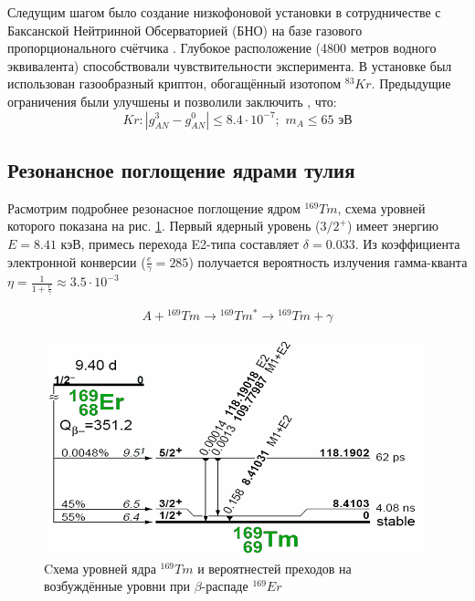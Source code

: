 \documentclass[a4paper,article,14pt]{extarticle}
\begin{document}
Следущим шагом было создание низкофоновой установки в сотрудничестве с Баксанской Нейтринной Обсерваторией (БНО) на базе газового пропорционального счётчика \cite{83Kr}. Глубокое расположение (4800 метров водного эквивалента) способствовали чувствительности эксперимента. В установке был использован газообразный криптон, обогащённый изотопом $^{83}Kr$. Предыдущие ограничения были улучшены \cite{Derbin_2017_Kr} и позволили заключить , что:
\begin{equation}
    Kr:\left| {g_{AN}^3 - g_{AN}^0} \right| \leqslant 8.4 \cdot {10^{ - 7}};\,\,{m_A} \leqslant 65 \text{ эВ}
\end{equation}

\subsection{Резонансное поглощение ядрами тулия}

Расмотрим подробнее резонасное поглощение ядром $^{169}Tm$, схема уровней  которого показана на рис. \ref{tmlvls}. Первый ядерный уровень ($3/2^+$) имеет энергию $E = 8.41 \text{ кэВ}$, примесь перехода E2-типа составляет $\delta = 0.033$. Из коэффициента электронной конверсии ($\frac{e}{\gamma} = 285$) \cite{lederer1978table} получается вероятность излучения гамма-кванта $\eta = \frac{1}{1 + \frac{e}{\gamma}} \approx 3.5 \cdot 10^{-3}$

\begin{equation}
    A + {}^{169}Tm \rightarrow {}^{169}Tm^{*} \rightarrow {}^{169}Tm + \gamma
\end{equation}

\begin{figure}[h]
    \centering
    \includegraphics[width = 0.75 \textwidth]{images/Tmlevels.png}
    \caption{Cхема уровней ядра $^{169}Tm$ и вероятнестей преходов на возбуждённые уровни при $\beta$-распаде $^{169}Er$ \cite{lederer1978table}}
    \label{tmlvls}
\end{figure}
\end{document}
